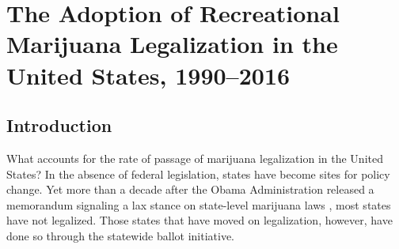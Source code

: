 \chapter{The Adoption of Recreational Marijuana Legalization in the United States, 1990--2016}







\section{Introduction}

What accounts for the rate of passage of marijuana legalization in the United States? In the absence of federal legislation, states have become sites for policy change. Yet more than a decade after the Obama Administration released a memorandum signaling a lax stance on state-level marijuana laws \citep{ogden_2009}, most states have not legalized. Those states that have moved on legalization, however, have done so through the statewide ballot initiative.

